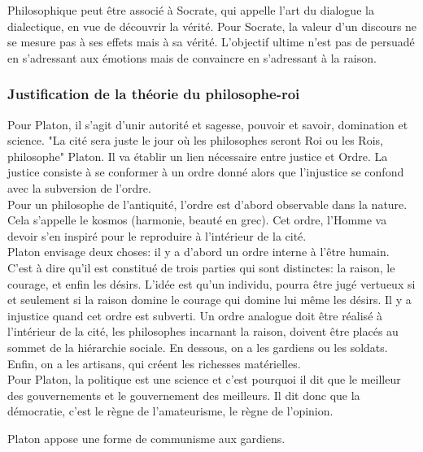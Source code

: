 \documentclass[10pt, a4paper, openany]{book}
\begin{document}
Philosophique peut être associé à Socrate, qui appelle l'art du dialogue la dialectique, en vue de découvrir la vérité. Pour Socrate, la valeur d'un discours ne se mesure pas à ses effets mais à sa vérité. L'objectif ultime n'est pas de persuadé en s'adressant aux émotions mais de convaincre en s'adressant à la raison. 

\subsubsection{Justification de la théorie du philosophe-roi}

Pour Platon, il s'agit d'unir autorité et sagesse, pouvoir et savoir, domination et science. "La cité sera juste le jour où les philosophes seront Roi ou les Rois, philosophe" Platon. Il va établir un lien nécessaire entre justice et Ordre. La justice consiste à se conformer à un ordre donné alors que l'injustice se confond avec la subversion de l'ordre. \\
Pour un philosophe de l'antiquité, l'ordre est d'abord observable dans la nature. Cela s'appelle le kosmos (harmonie, beauté en grec). Cet ordre, l'Homme va devoir s'en inspiré pour le reproduire à l'intérieur de la cité. \\
Platon envisage deux choses: il y a d'abord un ordre interne à l'être humain. C'est à dire qu'il est constitué de trois parties qui sont distinctes: la raison, le courage, et enfin les désirs. L'idée est qu'un individu, pourra être jugé vertueux si et seulement si la raison domine le courage qui domine lui même les désirs. Il y a injustice quand cet ordre est subverti. Un ordre analogue doit être réalisé à l'intérieur de la cité, les philosophes incarnant la raison, doivent être placés au sommet de la hiérarchie sociale. En dessous, on a les gardiens ou les soldats. Enfin, on a les artisans, qui créent les richesses matérielles. \\
Pour Platon, la politique est une science et c'est pourquoi il dit que le meilleur des gouvernements et le gouvernement des meilleurs. Il dit donc que la démocratie, c'est le règne de l'amateurisme, le règne de l'opinion. 


Platon appose une forme de communisme aux gardiens. 







\section{}

\section{}
\end{document}
